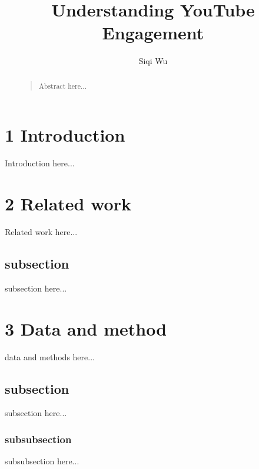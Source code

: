 \documentclass[letterpaper]{article}
\begin{document}
%

\title{Understanding YouTube Engagement}
\author{Siqi Wu}

\maketitle
\begin{abstract}
\begin{quote}
Abstract here...
\end{quote}
\end{abstract}

\section{1 Introduction}
Introduction here...

\section{2 Related work}
Related work here...

\subsection{subsection}
subsection here...

\section{3 Data and method}
data and methods here...

\subsection{subsection}
subsection here...

\subsubsection{subsubsection}
subsubsection here...
\end{document}

